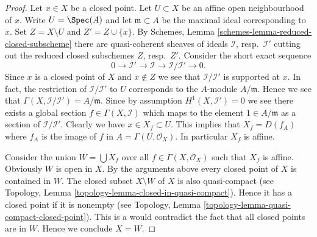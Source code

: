 \begin{proof}
Let $x \in X$ be a closed point. Let $U \subset X$ be an affine open
neighbourhood of $x$. Write $U = \Spec(A)$ and let
$\mathfrak m \subset A$ be the maximal ideal corresponding to $x$.
Set $Z = X \setminus U$ and $Z' = Z \cup \{x\}$.
By Schemes, Lemma \ref{schemes-lemma-reduced-closed-subscheme} there
are quasi-coherent sheaves of ideals
$\mathcal{I}$, resp.\ $\mathcal{I}'$ cutting out
the reduced closed subschemes $Z$, resp.\ $Z'$.
Consider the short exact sequence
$$
0 \to \mathcal{I}' \to \mathcal{I} \to \mathcal{I}/\mathcal{I}' \to 0.
$$
Since $x$ is a closed point of $X$ and $x \not \in Z$ we see that
$\mathcal{I}/\mathcal{I}'$ is supported at $x$. In fact, the restriction
of $\mathcal{I}/\mathcal{I'}$ to $U$ corresponds to the $A$-module
$A/\mathfrak m$. Hence we see that $\Gamma(X, \mathcal{I}/\mathcal{I'})
= A/\mathfrak m$. Since by assumption $H^1(X, \mathcal{I}') = 0$
we see there exists a global section $f \in \Gamma(X, \mathcal{I})$
which maps to the element $1 \in A/\mathfrak m$ as a section of
$\mathcal{I}/\mathcal{I'}$. Clearly we have
$x \in X_f \subset U$. This implies that $X_f = D(f_A)$ where
$f_A$ is the image of $f$ in $A = \Gamma(U, \mathcal{O}_X)$.
In particular $X_f$ is affine.

\medskip\noindent
Consider the union $W = \bigcup X_f$ over all $f \in \Gamma(X, \mathcal{O}_X)$
such that $X_f$ is affine. Obviously $W$ is open in $X$.
By the arguments above every closed point of
$X$ is contained in $W$. The closed subset $X \setminus W$ of $X$
is also quasi-compact
(see Topology, Lemma \ref{topology-lemma-closed-in-quasi-compact}).
Hence it has a closed point if it is nonempty (see
Topology, Lemma \ref{topology-lemma-quasi-compact-closed-point}).
This is a would contradict the fact that all closed points are in
$W$. Hence we conclude $X = W$.


\end{proof}
